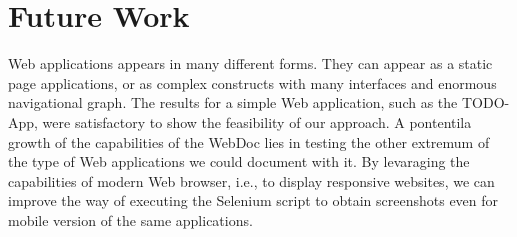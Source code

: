 \section{Future Work}\label{sec:futwork}

Web applications appears in many different forms. They can appear as a static page applications, or as complex constructs with many interfaces and enormous navigational graph. The results for a simple Web application, such as the TODO-App, were satisfactory to show the feasibility of our approach. A pontentila growth of the capabilities of the WebDoc lies in testing the other extremum of the type of Web applications we could document with it. By levaraging the capabilities of modern Web browser, i.e., to display responsive websites, we can improve the way of executing the Selenium script to obtain screenshots even for mobile version of the same applications. 

